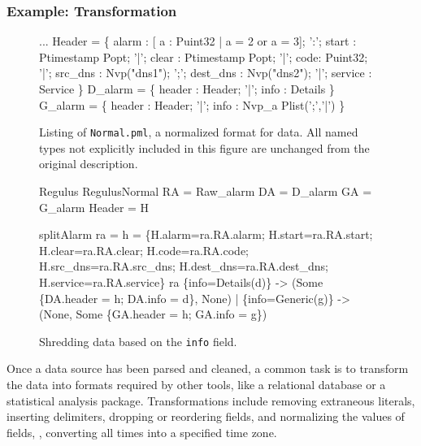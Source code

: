 \subsubsection{Example: Transformation}
\label{sec:ex-trans}

\begin{figure}
  \centering
  \begin{code}\scriptsize
...
 Header = \{
       alarm : [ a : Puint32 | a = 2 or a = 3];
 ':';  start :  Ptimestamp Popt;
 '|';  clear :  Ptimestamp Popt;
 '|';  code: Puint32;
 '|';  src\_dns  :  Nvp("dns1");
 ';';  dest\_dns :  Nvp("dns2");
 '|';  service  : Service
\}
\mbox{}
 D\_alarm = \{
       header : Header;
 '|';  info   : Details
 \}
\mbox{}
 G\_alarm = \{
       header : Header;
 '|';  info   : Nvp\_a Plist(';','|')
\}\end{code}
\caption{Listing of \texttt{\darkstar{}Normal.pml}, a normalized format for
  \darkstar{} data. All named types not explicitly included in this
  figure are unchanged from the original \darkstar{} description.}
\label{fig:normal-darkstar}
\end{figure}

\begin{figure}
\begin{code}\scriptsize
{} Regulus
 RegulusNormal
 RA = Raw\_alarm
 DA = D\_alarm
 GA = G\_alarm
 Header = H

 splitAlarm ra =
     h = 
       \{H.alarm=ra.RA.alarm; H.start=ra.RA.start; 
        H.clear=ra.RA.clear; H.code=ra.RA.code;
        H.src\_dns=ra.RA.src\_dns; 
        H.dest\_dns=ra.RA.dest\_dns;
        H.service=ra.RA.service\}
      ra 
        \{info=Details(d)\} -> 
        (Some \{DA.header = h; DA.info = d\}, None)
      | \{info=Generic(g)\} ->
        (None, Some \{GA.header = h; GA.info = g\})    
  \end{code}
  \caption{Shredding \darkstar{} data based on the {\tt info} field.}
  \label{fig:ex-no-err-check}
\end{figure}

Once a data source has been parsed and cleaned, a common task is to
transform the data into formats required by other tools, like a
relational database or a statistical analysis package.
Transformations include removing extraneous literals, inserting
delimiters, dropping or reordering fields, and normalizing the values
of fields, \eg{}, converting all times into a specified time zone.

